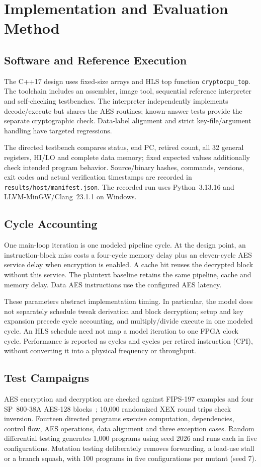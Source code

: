 \documentclass[conference,a4paper]{IEEEtran}
\begin{document}
\section{Implementation and Evaluation Method}
\subsection{Software and Reference Execution}
The C++17 design uses fixed-size arrays and HLS top function
\texttt{cryptocpu\_top}. The toolchain includes an assembler, image tool,
sequential reference interpreter and self-checking testbenches. The interpreter
independently implements decode/execute but shares the AES routines;
known-answer tests provide the separate cryptographic check. Data-label
alignment and strict key-file/argument handling have targeted regressions.

The directed testbench compares status, end PC, retired count, all 32 general
registers, HI/LO and complete data memory; fixed expected values additionally
check intended program behavior. Source/binary hashes, commands, versions,
exit codes and actual verification timestamps are recorded in
\texttt{results/host/manifest.json}. The recorded run uses Python~3.13.16
and LLVM-MinGW/Clang~23.1.1 on Windows.

\subsection{Cycle Accounting}
One main-loop iteration is one modeled pipeline cycle. At the design point,
an instruction-block miss costs a four-cycle memory delay plus an eleven-cycle
AES service delay when encryption is enabled. A cache hit reuses the decrypted
block without this service. The plaintext baseline retains the same pipeline,
cache and memory delay. Data AES instructions use the configured AES latency.

These parameters abstract implementation timing. In particular, the model does
not separately schedule tweak derivation and block decryption; setup and key
expansion precede cycle accounting, and multiply/divide execute in one modeled
cycle. An HLS schedule need not map a model iteration to one FPGA clock cycle.
Performance is reported as cycles and cycles per retired instruction (CPI),
without converting it into a physical frequency or throughput.

\subsection{Test Campaigns}
AES encryption and decryption are checked against FIPS-197 examples and four
SP~800-38A AES-128 blocks~\cite{aes,modes}; 10,000 randomized XEX round trips
check inversion. Fourteen directed programs exercise computation, dependencies,
control flow, AES operations, data alignment and three exception cases.
Random differential testing generates 1,000 programs using seed 2026 and runs
each in five configurations. Mutation testing deliberately removes forwarding,
a load-use stall or a branch squash, with 100 programs in five configurations
per mutant (seed 7).
\end{document}
